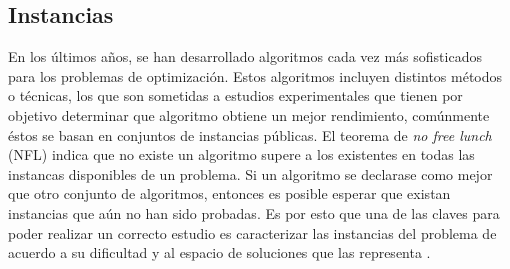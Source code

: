 


\subsection{Instancias}
\label{cap:instancias}


En los últimos años, se han desarrollado algoritmos cada vez más sofisticados para los problemas de optimización. Estos algoritmos incluyen distintos métodos o técnicas, los que son sometidas a estudios experimentales que tienen por objetivo determinar que algoritmo obtiene un mejor rendimiento, comúnmente éstos se basan en conjuntos de instancias públicas. El teorema de \textit{no free lunch} (NFL) indica que no existe un algoritmo supere a los existentes en todas las instancas disponibles de un problema. Si un algoritmo se declarase como mejor que otro conjunto de algoritmos, entonces es posible esperar que existan instancias que aún no han sido probadas. Es por esto que una de las claves para poder realizar un correcto estudio es caracterizar las instancias del problema de acuerdo a su dificultad y al espacio de soluciones que las representa \citep{smith_2012}.

